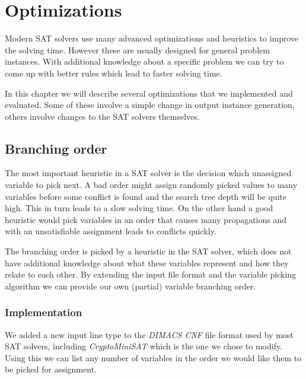\section{Optimizations}

Modern SAT solvers use many advanced optimizations and heuristics to improve the solving time.
However these are usually designed for general problem instances.
With additional knowledge about a specific problem we can try to come up with better rules which lead to faster solving time.

In this chapter we will describe several optimizations that we implemented and evaluated.
Some of these involve a simple change in output instance generation, others involve changes to the SAT solvers themselves.


\subsection{Branching order}
\label{sec:branching-order}

The most important heuristic in a SAT solver is the decision which unassigned variable to pick next.
A bad order might assign randomly picked values to many variables before some conflict is found and the search tree depth will be quite high.
This in turn leads to a slow solving time.
On the other hand a good heuristic would pick variables in an order that causes many propagations and with an unsatisfiable assignment leads to conflicts quickly.

The branching order is picked by a heuristic in the SAT solver, which does not have additional knowledge about what these variables represent and how they relate to each other.
By extending the input file format and the variable picking algorithm we can provide our own (partial) variable branching order.

\subsubsection{Implementation}

We added a new input line type to the \emph{DIMACS CNF} file format used by most SAT solvers, including \emph{CryptoMiniSAT} which is the one we chose to modify.
Using this we can list any number of variables in the order we would like them to be picked for assignment.

